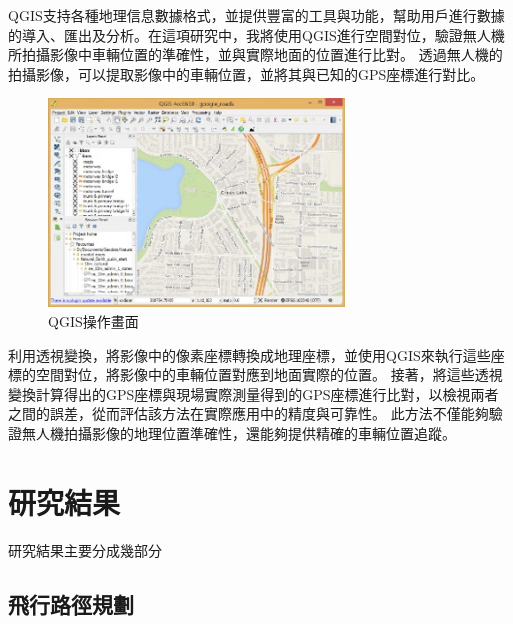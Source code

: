 \documentclass[12pt]{article}       %
\begin{document}
QGIS支持各種地理信息數據格式，並提供豐富的工具與功能，幫助用戶進行數據的導入、匯出及分析。在這項研究中，我將使用QGIS進行空間對位，驗證無人機所拍攝影像中車輛位置的準確性，並與實際地面的位置進行比對。
透過無人機的拍攝影像，可以提取影像中的車輛位置，並將其與已知的GPS座標進行對比。
\begin{figure}[H]
    \centering
    \includegraphics[width=0.7\textwidth]{qgis.jpg}     %
    \caption{QGIS操作畫面\cite{qgis_2020}}    %
    \label{fig:qgis}    %
\end{figure}
利用透視變換，將影像中的像素座標轉換成地理座標，並使用QGIS來執行這些座標的空間對位，將影像中的車輛位置對應到地面實際的位置。
接著，將這些透視變換計算得出的GPS座標與現場實際測量得到的GPS座標進行比對，以檢視兩者之間的誤差，從而評估該方法在實際應用中的精度與可靠性。
此方法不僅能夠驗證無人機拍攝影像的地理位置準確性，還能夠提供精確的車輛位置追蹤。


\section{\centering 研究結果}
\hspace{2em}研究結果主要分成幾部分


\subsection{飛行路徑規劃}
\hspace{2em}
\end{document}

